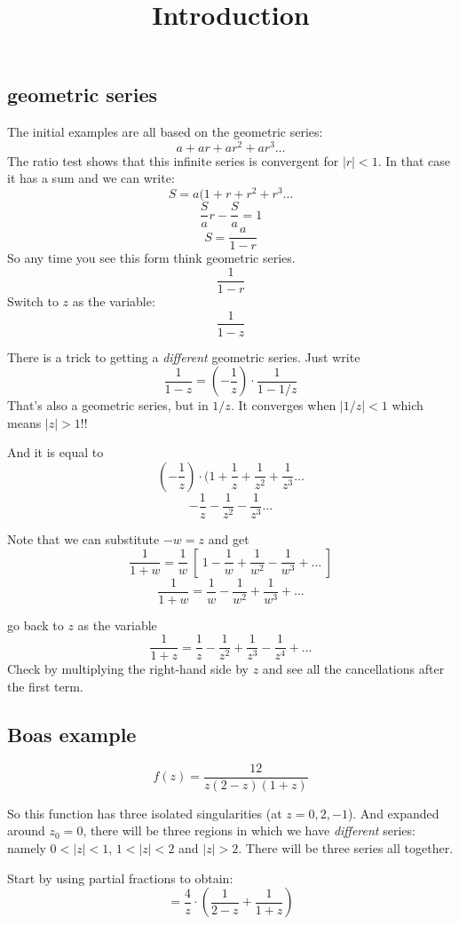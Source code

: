 \documentclass[11pt, oneside]{article}
\title{Introduction}
\date{}
\begin{document}
\maketitle
\Large


\subsection*{geometric series}

The initial examples are all based on the geometric series:
\[ a + ar + ar^2 + ar^3 \dots \]
The ratio test shows that this infinite series is convergent for $|r| < 1$.  In that case it has a sum and we can write:
\[ S = a(1 + r + r^2 + r^3 \dots \]
\[ \frac{S}{a} r - \frac{S}{a} = 1 \]
\[ S = \frac{a}{1-r} \]
So any time you see this form think geometric series.
\[ \frac{1}{1 - r} \]
Switch to $z$ as the variable:
\[ \frac{1}{1 - z} \]

There is a trick to getting a \emph{different} geometric series.  Just write
\[ \frac{1}{1 - z} = (-\frac{1}{z}) \cdot \frac{1}{1 - 1/z} \]
That's also a geometric series, but in $1/z$.  It converges when $|1/z| < 1$ which means $|z| > 1$!!  

And it is equal to
\[ (-\frac{1}{z}) \cdot (1 + \frac{1}{z} + \frac{1}{z^2} + \frac{1}{z^3} \dots \]
\[ - \frac{1}{z} - \frac{1}{z^2} - \frac{1}{z^3} \dots \]

Note that we can substitute $-w = z$ and get
\[ \frac{1}{1+w} =  \frac{1}{w} \ [ \ 1 - \frac{1}{w} + \frac{1}{w^2} - \frac{1}{w^3} + \dots \ ] \]
\[ \frac{1}{1+w} =  \frac{1}{w} - \frac{1}{w^2} + \frac{1}{w^3} + \dots \]

go back to $z$ as the variable
\[ \frac{1}{1+z} =  \frac{1}{z} - \frac{1}{z^2} + \frac{1}{z^3} - \frac{1}{z^4} + \dots \]
Check by multiplying the right-hand side by $z$ and see all the cancellations after the first term.

\subsection*{Boas example}
\[ f(z) = \frac{12}{z(2 - z)(1 + z)} \]

So this function has three isolated singularities (at $z = 0, 2, -1$). And expanded around $z_0 = 0$, there will be three regions in which we have \emph{different} series:  namely $0 < |z| < 1$, $1 < |z| < 2$ and $|z| > 2$.  There will be three series all together.

Start by using partial fractions to obtain:
\[ = \frac{4}{z} \cdot (\frac{1}{2 - z} + \frac{1}{1 + z}) \]
\end{document}
